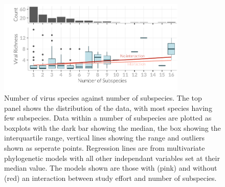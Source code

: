 \begin{knitrout}\footnotesize
{}\color{fgcolor}\begin{figure}[t]

{\centering \includegraphics[width=0.8\textwidth]{figure/boxplot-1} 

}

\caption[Number of virus species against number of subspecies]{Number of virus species against number of subspecies. 		
The top panel shows the distribution of the data, with most species having few subspecies.		
Data within a number of subspecies are plotted as boxplots with the dark bar showing the median, the box showing the interquartile range, vertical lines showing the range and outliers shown as seperate points.		
Regression lines are from multivariate phylogenetic models with all other independant variables set at their median value.		
The models shown are those with (pink) and without (red) an interaction between study effort and number of subspecies.		
}\label{fig:boxplot}
\end{figure}


\end{knitrout}






